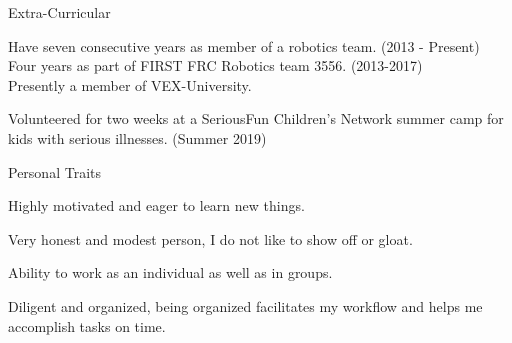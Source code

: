 \documentclass{resume} %
\begin{document}
\begin{rSection}{Extra-Curricular} \itemsep -3pt
	\item Have seven consecutive years as member of a robotics team. (2013 - Present)\\
	Four years as part of FIRST FRC Robotics team 3556. (2013-2017)\\
	Presently a member of VEX-University.
	\item Volunteered for two weeks at a SeriousFun Children's Network summer camp for kids with serious illnesses. (Summer 2019)
\end{rSection}

\begin{rSection}{Personal Traits}
	\item Highly motivated and eager to learn new things.
	\item Very honest and modest person, I do not like to show off or gloat.
	\item Ability to work as an individual as well as in groups.
	\item Diligent and organized, being organized facilitates my workflow and helps me accomplish tasks on time.
\end{rSection}
\end{document}
